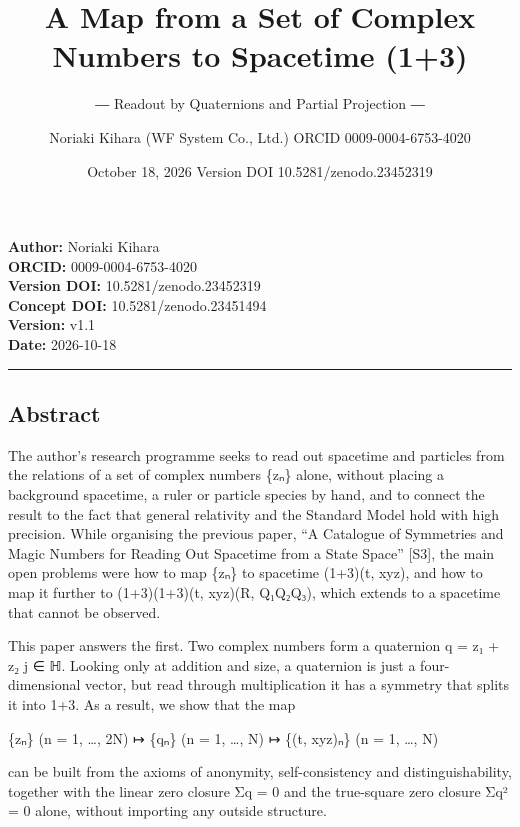 \documentclass[
  a4paper,
]{article}
\title{A Map from a Set of Complex Numbers to Spacetime (1+3)}
\subtitle{― Readout by Quaternions and Partial Projection ―}
\author{Noriaki Kihara (WF System Co., Ltd.) ORCID 0009-0004-6753-4020}
\date{October 18, 2026 Version DOI 10.5281/zenodo.23452319}
\begin{document}
\maketitle

\textbf{Author:} Noriaki Kihara\\
\textbf{ORCID:} 0009-0004-6753-4020\\
\textbf{Version DOI:} 10.5281/zenodo.23452319\\
\textbf{Concept DOI:} 10.5281/zenodo.23451494\\
\textbf{Version:} v1.1\\
\textbf{Date:} 2026-10-18

\begin{center}\rule{0.5\linewidth}{0.5pt}\end{center}

\subsection{Abstract}\label{abstract}

The author's research programme seeks to read out spacetime and
particles from the relations of a set of complex numbers \{zₙ\} alone,
without placing a background spacetime, a ruler or particle species by
hand, and to connect the result to the fact that general relativity and
the Standard Model hold with high precision. While organising the
previous paper, ``A Catalogue of Symmetries and Magic Numbers for
Reading Out Spacetime from a State Space'' {[}S3{]}, the main open
problems were how to map \{zₙ\} to spacetime (1+3)(t, xyz), and how to
map it further to (1+3)(1+3)(t, xyz)(R, Q₁Q₂Q₃), which extends to a
spacetime that cannot be observed.

This paper answers the first. Two complex numbers form a quaternion q =
z₁ + z₂ j ∈ ℍ. Looking only at addition and size, a quaternion is just a
four-dimensional vector, but read through multiplication it has a
symmetry that splits it into 1+3. As a result, we show that the map

\{zₙ\} (n = 1, \ldots, 2N) ↦ \{qₙ\} (n = 1, \ldots, N) ↦ \{(t, xyz)ₙ\}
(n = 1, \ldots, N)

can be built from the axioms of anonymity, self-consistency and
distinguishability, together with the linear zero closure Σq = 0 and the
true-square zero closure Σq² = 0 alone, without importing any outside
structure.
\end{document}
